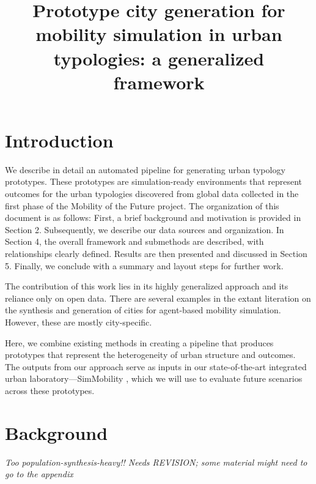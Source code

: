 \documentclass[11pt,twoside]{article}
\numberwithin{equation}{section}
\newcommand{\?}{\stackrel{?}{=}}
\begin{document}
\title{Prototype city generation for mobility simulation in urban typologies: a  generalized framework}
\author{}
\maketitle


\section{Introduction}
We describe in detail an automated pipeline for generating urban typology prototypes.
These prototypes are simulation-ready environments that represent outcomes for the urban typologies discovered from global data collected in the first phase of the Mobility of the Future project.
The organization of this document is as follows: First, a brief background and motivation is provided in Section 2. Subsequently, we describe our data sources and organization.
In Section 4, the overall framework and submethods are described, with relationships clearly defined.
Results are then presented and discussed in Section 5.
Finally, we conclude with a summary and layout steps for further work.

The contribution of this work lies in its highly generalized approach and its reliance only on open data.
There are several examples in the extant literation on the synthesis and generation of cities for agent-based mobility simulation.
However, these are mostly city-specific.

Here, we combine existing methods in creating a pipeline that produces prototypes that represent the heterogeneity of urban structure and outcomes.
The outputs from our approach serve as inputs in our state-of-the-art integrated urban laboratory---SimMobility \citep{adnan2016simmobility}, which we will use to evaluate future scenarios across these prototypes.

\section{Background}
{\it Too population-synthesis-heavy!! Needs REVISION; some material might need to go to the appendix}\\
\end{document}
